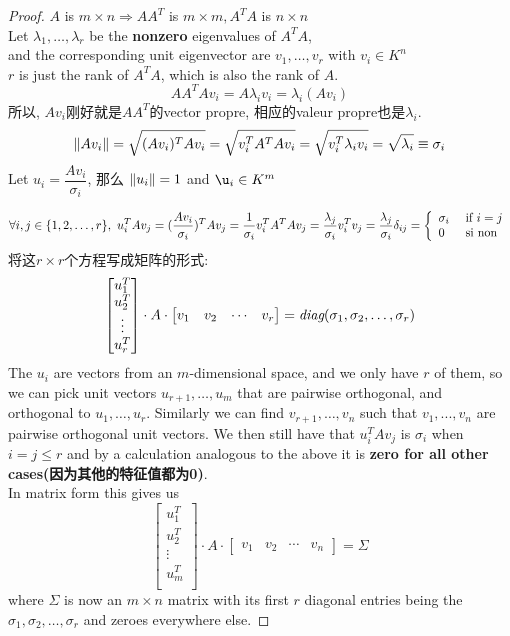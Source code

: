 \documentclass{book}
\begin{document}
\begin{proof}
$A$ is $m \times n \Rightarrow AA^T$ is $m \times m, A^T A$ is $n \times n$\\
Let $\lambda_1, \ldots, \lambda_r$ be the \textbf{nonzero} eigenvalues of $A^T A$, \\
and the corresponding unit eigenvector are $v_1, \ldots, v_r$ with $v_i \in K^n$\\
$r$ is just the rank of $A^T A$, which is also the rank of $A$.
$$A A^T A v_i = A \lambda_i v_i = \lambda_i (A v_i)$$
所以, $Av_i$刚好就是$A A^T$的vector propre, 相应的valeur propre也是$\lambda_i$.
$$\left\Vert Av_i\right\Vert = \sqrt{(Av_i)^T Av_i} = \sqrt{v_i^T A^T Av_i} = \sqrt{v_i^T \lambda_i v_i} = \sqrt{\lambda_i} \equiv \sigma_i$$
Let $u_i = \dfrac{Av_i}{\sigma_i}$, 那么 $\left\Vert u_i\right\Vert = 1$ and $\u_i \in K^m$

$$
\forall i, j \in \{1,2,\ldots, r\},\
u_i^T Av_j
= (\dfrac{Av_i}{\sigma_i})^T Av_j
= \dfrac{1}{\sigma_i} v_i^T A^T Av_j
= \dfrac{\lambda_j}{\sigma_i} v_i^T v_j
= \dfrac{\lambda_j}{\sigma_i} \delta_{ij}
=
\left\{
  \begin{array}{ll}
    \sigma_i & \textrm{\ if } i = j \\
    0 & \textrm{ si non}
  \end{array}
\right.
$$
将这$r \times r$个方程写成矩阵的形式:
$$
\begin{bmatrix}
u_1^T \\
u_2^T \\
\vdots \\
u_r^T \\
\end{bmatrix}
\cdot
A
\cdot
\begin{bmatrix}
v_1 & v_2 & \cdots & v_r
\end{bmatrix}
=\textit{diag}(\sigma_1, \sigma_2, \ldots, \sigma_r)
$$
The $u_i$ are vectors from an $m$-dimensional space, and we only have $r$ of them, so we can pick unit
vectors $u_{r+1}, \ldots, u_m$ that are pairwise orthogonal, and orthogonal to $u_1,\ldots, u_r$. Similarly we can
find $v_{r+1}, \ldots, v_n$ such that $v_1,...,v_n$ are pairwise orthogonal unit vectors. We then still have that
$u_i^T A v_j$ is $\sigma_i$ when $i = j \leq r$ and by a calculation analogous to the above it is
\textbf{zero for all other cases(因为其他的特征值都为0)}.\\
In matrix form this gives us
$$
\begin{bmatrix}
u_1^T \\
u_2^T \\
\vdots \\
u_m^T \\
\end{bmatrix}
\cdot
A
\cdot
\begin{bmatrix}
v_1 & v_2 & \cdots & v_n
\end{bmatrix}
=\Sigma
$$
where $\Sigma$ is now an $m \times n$ matrix with its first $r$ diagonal entries being the
$\sigma_1, \sigma_2, \ldots, \sigma_r$ and zeroes everywhere else.


\end{proof}
\end{document}
